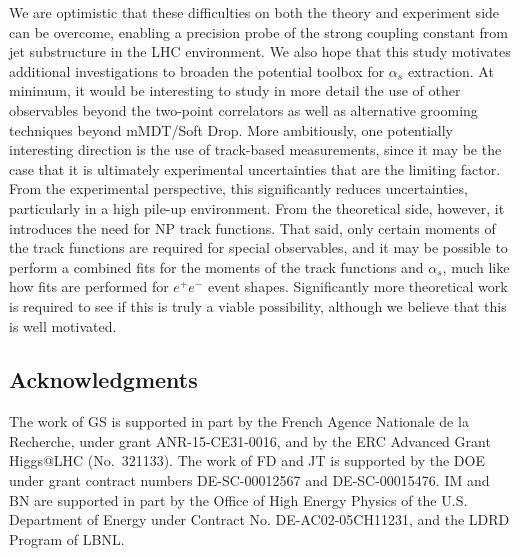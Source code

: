 \documentclass[11pt]{cernrep}
\begin{document}
We are optimistic that these difficulties on both the theory and experiment side can be overcome, enabling a precision probe of the strong coupling constant from jet substructure in the LHC environment.
%
We also hope that this study motivates additional investigations to broaden the potential toolbox for $\alpha_s$ extraction.
%
At minimum, it would be interesting to study in more detail the use of other observables beyond the two-point correlators as well as alternative grooming techniques beyond mMDT/Soft Drop.
%
More ambitiously, one potentially interesting direction is the use of track-based measurements, since it may be the case that it is ultimately experimental uncertainties that are the limiting factor.
%
From the experimental perspective, this significantly reduces uncertainties, particularly in a high pile-up environment.
%
From the theoretical side, however, it introduces the need for NP track functions.
%
That said, only certain moments of the track functions are required for special observables, and it may be possible to perform a combined fits for the moments of the track functions and $\alpha_s$, much like how fits are performed for $e^+e^-$ event shapes.
%
Significantly more theoretical work is required to see if this is truly a viable possibility, although we believe that this is well motivated.


\subsection*{Acknowledgments}

The work of GS is supported in part by the French Agence Nationale de la Recherche,
under grant ANR-15-CE31-0016, and by the ERC Advanced Grant Higgs@LHC
(No.\ 321133).
%
The work of FD and JT is supported by the DOE under grant contract numbers DE-SC-00012567 and DE-SC-00015476.
%
IM and BN are supported in part by the Office of High Energy Physics of the U.S. Department of Energy under Contract No. DE-AC02-05CH11231, and the LDRD Program of LBNL.


\end{document}
